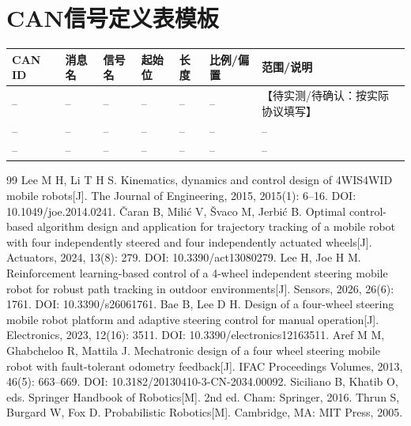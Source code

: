 \documentclass[UTF8,openany,12pt,a4paper]{ctexrep}
\newcommand{\placeholder}[1]{\textcolor{red!70!black}{【待实测/待确认：#1】}}
\begin{document}
\chapter{CAN信号定义表模板}
\begin{longtable}{p{1.5cm}p{2.0cm}p{2.1cm}p{1.5cm}p{1.7cm}p{2.0cm}p{2.4cm}}
\toprule CAN ID & 消息名 & 信号名 & 起始位 & 长度 & 比例/偏置 & 范围/说明\\ \midrule
-- & -- & -- & -- & -- & -- & \placeholder{按实际协议填写}\\
-- & -- & -- & -- & -- & -- & --\\ -- & -- & -- & -- & -- & -- & --\\ \bottomrule
\end{longtable}

\begin{thebibliography}{99}
 Lee M H, Li T H S. Kinematics, dynamics and control design of 4WIS4WID mobile robots[J]. The Journal of Engineering, 2015, 2015(1): 6--16. DOI: 10.1049/joe.2014.0241.
 \v{C}aran B, Mili\'{c} V, \v{S}vaco M, Jerbi\'{c} B. Optimal control-based algorithm design and application for trajectory tracking of a mobile robot with four independently steered and four independently actuated wheels[J]. Actuators, 2024, 13(8): 279. DOI: 10.3390/act13080279.
 Lee H, Joe H M. Reinforcement learning-based control of a 4-wheel independent steering mobile robot for robust path tracking in outdoor environments[J]. Sensors, 2026, 26(6): 1761. DOI: 10.3390/s26061761.
 Bae B, Lee D H. Design of a four-wheel steering mobile robot platform and adaptive steering control for manual operation[J]. Electronics, 2023, 12(16): 3511. DOI: 10.3390/electronics12163511.
 Aref M M, Ghabcheloo R, Mattila J. Mechatronic design of a four wheel steering mobile robot with fault-tolerant odometry feedback[J]. IFAC Proceedings Volumes, 2013, 46(5): 663--669. DOI: 10.3182/20130410-3-CN-2034.00092.
 Siciliano B, Khatib O, eds. Springer Handbook of Robotics[M]. 2nd ed. Cham: Springer, 2016.
 Thrun S, Burgard W, Fox D. Probabilistic Robotics[M]. Cambridge, MA: MIT Press, 2005.
\end{thebibliography}
\end{document}
